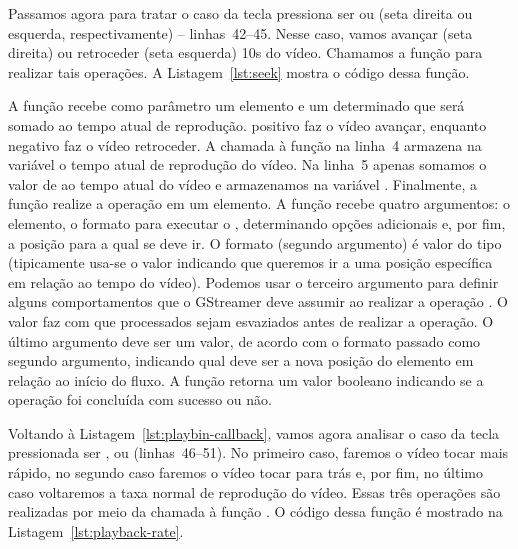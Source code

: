 Passamos agora para tratar o caso da tecla pressiona ser  ou
 (seta direita ou esquerda, respectivamente) -- linhas~42--45.
Nesse caso, vamos avançar (seta direita) ou retroceder (seta esquerda) 10s do
vídeo. Chamamos a função  para realizar tais operações.
A Listagem~\ref{lst:seek} mostra o código dessa função.



A função  recebe como parâmetro um elemento e um determinado 
que será somado ao tempo atual de reprodução.  positivo faz o vídeo
avançar, enquanto negativo faz o vídeo retroceder. A chamada à função
 na linha~4 armazena na variável  o
tempo atual de reprodução do vídeo. Na linha~5 apenas somamos o valor de
 ao tempo atual do vídeo e armazenamos na variável .
Finalmente, a função  realize a operação 
em um elemento. A função recebe quatro argumentos: o elemento, o formato 
para executar o ,  determinando opções adicionais e, por fim,
a posição para a qual se deve ir. O formato (segundo argumento) é valor do
tipo  (tipicamente usa-se o valor  indicando
que queremos ir a uma posição específica em relação ao tempo do vídeo). Podemos
usar o terceiro argumento para definir alguns comportamentos que o GStreamer
deve assumir ao realizar a operação . O valor 
faz com que  processados sejam esvaziados antes de realizar a
operação. O último argumento deve ser um valor, de acordo com o formato passado
como segundo argumento, indicando qual deve ser a nova posição do elemento
em relação ao início do fluxo. A função retorna um valor booleano indicando
se a operação foi concluída com sucesso ou não.

Voltando à Listagem~\ref{lst:playbin-callback}, vamos agora analisar o caso
da tecla pressionada ser ,  ou  (linhas~46--51). No primeiro
caso, faremos o vídeo tocar mais rápido, no segundo caso faremos o vídeo tocar
para trás e, por fim, no último caso voltaremos a taxa normal de reprodução
do vídeo. Essas três operações são realizadas por meio da chamada à função
. O código dessa função é mostrado na
Listagem~\ref{lst:playback-rate}.




